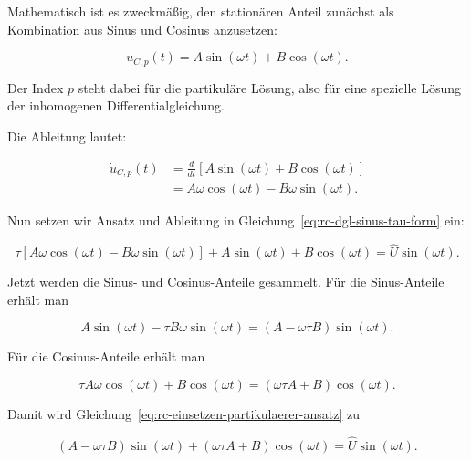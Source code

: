 Mathematisch ist es zweckmäßig, den stationären Anteil zunächst als Kombination
aus Sinus und Cosinus anzusetzen:

\begin{equation}
	u_{C,p}(t)
	=
	A\sin(\omega t) + B\cos(\omega t).
	\label{eq:rc-partikulaerer-ansatz-sinus-cosinus}
\end{equation}

Der Index \(p\) steht dabei für die partikuläre Lösung, also für eine spezielle
Lösung der inhomogenen Differentialgleichung.

Die Ableitung lautet:

\begin{align}
	\dot{u}_{C,p}(t)
	&=
	\frac{d}{dt}
	\left[
	A\sin(\omega t) + B\cos(\omega t)
	\right] \\[4pt]
	&=
	A\omega\cos(\omega t)
	-
	B\omega\sin(\omega t).
	\label{eq:rc-ableitung-partikulaerer-ansatz}
\end{align}

Nun setzen wir Ansatz und Ableitung in Gleichung~\eqref{eq:rc-dgl-sinus-tau-form}
ein:

\begin{equation}
	\tau
	\left[
	A\omega\cos(\omega t)
	-
	B\omega\sin(\omega t)
	\right]
	+
	A\sin(\omega t)
	+
	B\cos(\omega t)
	=
	\hat{U}\sin(\omega t).
	\label{eq:rc-einsetzen-partikulaerer-ansatz}
\end{equation}

Jetzt werden die Sinus- und Cosinus-Anteile gesammelt. Für die Sinus-Anteile
erhält man

\begin{equation}
	A\sin(\omega t)
	-
	\tau B\omega\sin(\omega t)
	=
	\left(A-\omega\tau B\right)\sin(\omega t).
	\label{eq:rc-sinus-anteile}
\end{equation}

Für die Cosinus-Anteile erhält man

\begin{equation}
	\tau A\omega\cos(\omega t)
	+
	B\cos(\omega t)
	=
	\left(\omega\tau A+B\right)\cos(\omega t).
	\label{eq:rc-cosinus-anteile}
\end{equation}

Damit wird Gleichung~\eqref{eq:rc-einsetzen-partikulaerer-ansatz} zu

\begin{equation}
	\left(A-\omega\tau B\right)\sin(\omega t)
	+
	\left(\omega\tau A+B\right)\cos(\omega t)
	=
	\hat{U}\sin(\omega t).
	\label{eq:rc-koeffizientenvergleich-ausgangspunkt}
\end{equation}

